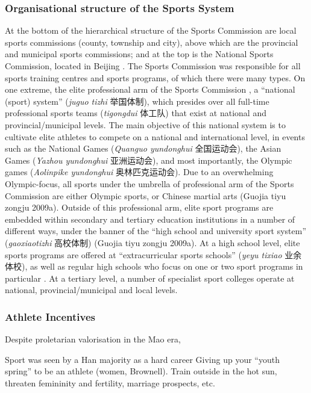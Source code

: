 {\subsubsection{Organisational structure of the Sports System}
At the bottom of the hierarchical structure of the Sports Commission are local sports commissions (county, township and city), above which are the provincial and municipal sports commissions; and at the top is the National Sports Commission, located in Beijing \citep[59]{Brownell1995}.  The Sports Commission was responsible for all sports training centres and sports programs, of which there were many types.  On one extreme, the elite professional arm of the Sports Commission , a ``national (sport) system'' (\textit{juguo tizhi} 举国体制), which presides over all full-time professional sports teams (\textit{tigongdui} 体工队) that exist at national and provincial/municipal levels.  The main objective of this national system is to cultivate elite athletes to compete on a national and international level, in events such as the National Games (\textit{Quanguo yundonghui} 全国运动会), the Asian Games (\textit{Yazhou yundonghui} 亚洲运动会), and most importantly, the Olympic games (\textit{Aolinpike yundonghui} 奥林匹克运动会).  Due to an overwhelming Olympic-focus, all sports under the umbrella of professional arm of the Sports Commission are either Olympic sports, or Chinese martial arts (Guojia tiyu zongju 2009a).  Outside of this professional arm, elite sport programs are embedded within secondary and tertiary education institutions in a number of different ways, under the banner of the ``high school and university sport system'' (\textit{gaoxiaotizhi} 高校体制) (Guojia tiyu zongju 2009a).  At a high school level, elite sports programs are offered at ``extracurricular sports schools'' (\textit{yeyu tixiao} 业余体校), as well as regular high schools who focus on one or two sport programs in particular \citep[59]{Brownell1995}. At a tertiary level, a number of specialist sport colleges operate at national, provincial/municipal and local levels.


\subsubsection{Athlete Incentives}

Despite proletarian valorisation in the Mao era,

Sport was seen by a Han majority as a hard career
Giving up your ``youth spring'' to be an athlete (women, Brownell).  Train outside in the hot sun, threaten femininity and fertility, marriage prospects, etc.

}
